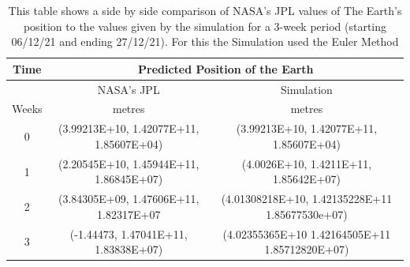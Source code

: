 \documentclass[a4paper,10pt]{article}
\begin{document}
\begin{table}[htp!]
\begin{center}
\begin{tabular}{|c|c|c|}
\hline 
Time & \multicolumn{2}{|c|}{Predicted Position of the Earth}  \\
\hline
  & NASA's JPL & Simulation\\
Weeks & metres & metres \\
\hline
   0 & (3.99213E+10, 1.42077E+11, 1.85607E+04) &  (3.99213E+10, 1.42077E+11, 1.85607E+04) \\ 
   1 & (2.20545E+10, 1.45944E+11, 1.86845E+07) & (4.0026E+10, 1.4211E+11, 1.85642E+07)   \\
   2 & (3.84305E+09, 1.47606E+11, 1.82317E+07 & (4.01308218E+10, 1.42135228E+11 1.85677530e+07)  \\
   3 & (-1.44473, 1.47041E+11, 1.83838E+07) & (4.02355365E+10 1.42164505E+11 1.85712820E+07)   \\
   
\hline 
\end{tabular}
\end{center}
\caption{\label{table:Magnitude of Conserved Quantities} This table shows a side by side comparison of NASA's JPL values of The Earth's position to the values given by the simulation for a 3-week period (starting 06/12/21 and ending 27/12/21). For this the Simulation used the Euler Method}
\end{table}
\end{document}
